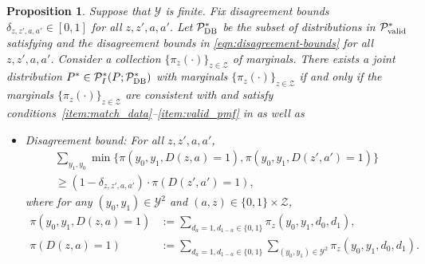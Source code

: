 \documentclass[12pt]{article}%
\newtheorem{prop}{Proposition}
\theoremstyle{definition}
\newcommand\1{\operatorname{I}\indicatorfence}
\begin{document}
\begin{prop}\label{prop:coupling_result_with_disagreement} Suppose that
  $\mathcal{Y}$ is finite. Fix disagreement bounds
  $\delta_{z, z', a, a'} \in [0,1]$ for all $z, z', a, a'$. Let
  $\mathcal{P}^*_{\textnormal{DB}}$ be the subset of distributions in
  $\mathcal{P}^{*}_{\textnormal{valid}}$ satisfying
   and the disagreement bounds in
  \cref{eqn:disagreement-bounds} for all $z, z', a, a'$. Consider a collection
  $\{\pi_{z}(\cdot)\}_{z\in\mathcal{Z}}$ of marginals. There exists a joint distribution
  $P^* \in \mathcal{P}^*_{I}(P;\mathcal{P}^{*}_{\textnormal{DB}})$ with marginals $\{\pi_{z}(\cdot) \}_{z \in \mathcal{Z}}$ if and only if the
  marginals $\{\pi_{z}(\cdot) \}_{z \in \mathcal{Z}}$ are consistent with  and satisfy conditions~\ref{item:match_data}--\ref{item:valid_pmf} in
   as well as
  \begin{itemize}
      \item[4.]\label{item:disagreement-bound} Disagreement bound: For all $z, z', a, a'$,
      \begin{multline}\label{eqn:disagreement-bound-inequality}
        \sum_{y_1, y_0} \min\{\pi(y_0, y_1, D(z, a) = 1),
          \pi(y_0, y_1, D(z', a') = 1) \} \\
        \geq (1-\delta_{z, z', a, a'}) \cdot \pi(D(z', a')=1),
      \end{multline}
      where for any $(y_0,y_1) \in \mathcal{Y}^2$ and $(a, z)\in \{0,1\} \times \mathcal{Z}$,
      \begin{align*}
      \pi(y_0, y_1, D(z, a)=1) &:= \sum_{d_a=1, d_{1-a} \in \{0,1\}} \pi_{z}(y_0,y_1, d_0, d_1), \\
      \pi(D(z, a)=1) &:= \sum_{d_{a}=1, d_{1-a}\in \{0,1\}} \sum_{(y_0,y_1) \in \mathcal{Y}^2} \pi_{z}(y_0, y_1, d_0, d_1).
 \end{align*}
  \end{itemize}
\end{prop}
\end{document}
